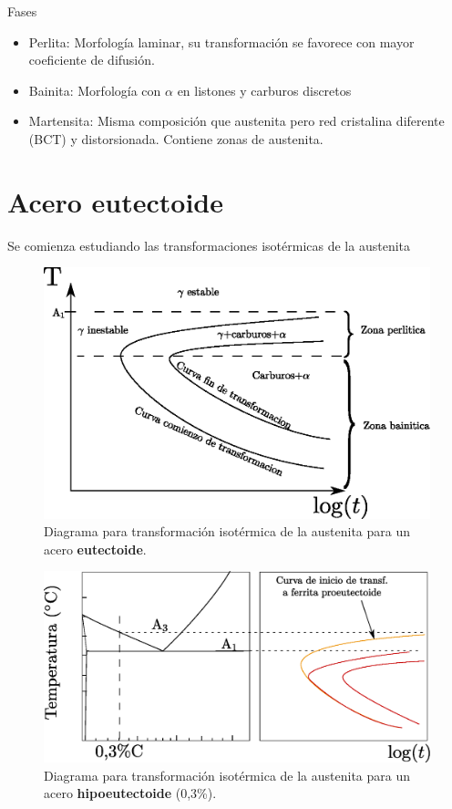 Fases
\begin{itemize}
    \item Perlita: Morfología laminar, su transformación se favorece con mayor coeficiente de difusión.
    \item Bainita: Morfología con $\alpha$ en listones y carburos discretos
    \item Martensita: Misma composición que austenita pero red cristalina diferente (BCT) y distorsionada. Contiene zonas de austenita.
\end{itemize}



\section{Acero eutectoide}
Se comienza estudiando las transformaciones isotérmicas de la austenita
\begin{figure}[htb!]
    \centering
    \includegraphics[width=\textwidth]{fig/TTTbasic.eps}
    \caption{Diagrama para transformación isotérmica de la austenita para un acero \textbf{eutectoide}.}
    \label{fig:diagTTTbasico}
\end{figure}

\begin{figure}[htb!]
    \centering
    \includegraphics[width=\textwidth]{fig/diagTTThipo.eps}
    \caption{Diagrama para transformación isotérmica de la austenita para un acero \textbf{hipoeutectoide} (0,3\%).}
    \label{fig:diagTTThipo}
\end{figure}

